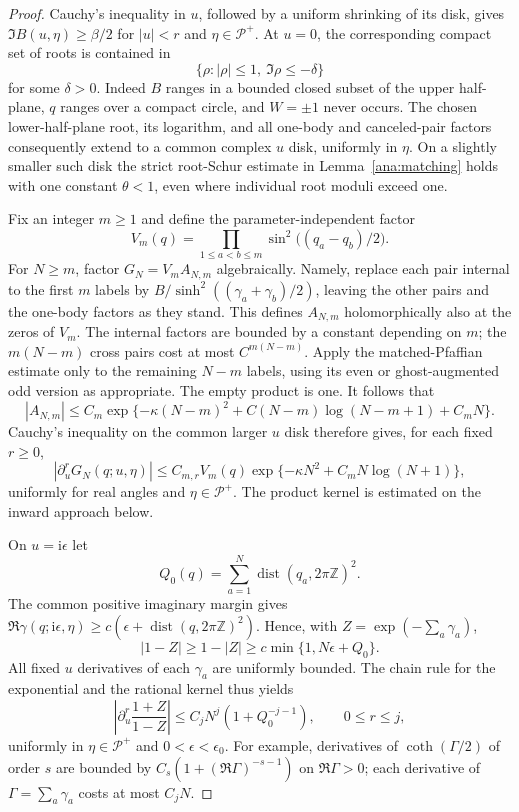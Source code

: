 \documentclass[11pt]{article}
\numberwithin{equation}{section}
\theoremstyle{definition}
\begin{document}
\begin{proof}
Cauchy's inequality in $u$, followed by a uniform shrinking of its
disk, gives $\Im B(u,\eta)\ge\beta/2$ for $|u|<r$ and
$\eta\in\mathcal P^+$.  At $u=0$, the corresponding compact
set of roots is contained in
\[
 \{\rho:|\rho|\le1,\ \Im\rho\le-\delta\}
\]
for some $\delta>0$.  Indeed $B$ ranges in a bounded closed subset
of the upper half-plane, $q$ ranges over a compact circle, and
$W=\pm1$ never occurs.  The chosen lower-half-plane root, its
logarithm, and all one-body and canceled-pair factors consequently
extend to a common complex $u$ disk, uniformly in $\eta$.
On a slightly smaller such disk the strict root-Schur estimate in
Lemma~\ref{ana:matching} holds with one constant $\theta<1$, even
where individual root moduli exceed one.

Fix an integer $m\ge1$ and define the parameter-independent factor
\[
 V_m(q)=\prod_{1\le a<b\le m}
                  \sin^2\bigl((q_a-q_b)/2\bigr).
\]
For $N\ge m$, factor $G_N=V_m A_{N,m}$ algebraically.  Namely,
replace each pair internal to the first $m$ labels by
$B/\sinh^2((\gamma_a+\gamma_b)/2)$, leaving the other pairs and
the one-body factors as they stand. This defines $A_{N,m}$
holomorphically also at the zeros of $V_m$.
The internal factors are bounded by a constant depending on $m$;
the $m(N-m)$ cross pairs cost at most $C^{m(N-m)}$.
Apply the matched-Pfaffian estimate only to the remaining $N-m$
labels, using its even or ghost-augmented odd version as appropriate.
The empty product is one.  It follows that
\[
 |A_{N,m}|
 \le C_m\exp\{-\kappa(N-m)^2
       +C(N-m)\log(N-m+1)+C_mN\}.
\]
Cauchy's inequality on the common larger $u$ disk therefore gives,
for each fixed $r\ge0$,
\begin{equation}\label{ana:block-numerator}
 |\partial_u^rG_N(q;u,\eta)|
 \le C_{m,r}V_m(q)
       \exp\{-\kappa N^2+C_mN\log(N+1)\},
\end{equation}
uniformly for real angles and $\eta\in\mathcal P^+$.
The product kernel is estimated on the inward approach below.

On $u=\mathrm i\epsilon$ let
\[
 Q_0(q)=\sum_{a=1}^N\operatorname{dist}(q_a,2\pi\mathbb Z)^2.
\]
The common positive imaginary margin gives
$\Re\gamma(q;\mathrm i\epsilon,\eta)
\ge c(\epsilon+\operatorname{dist}(q,2\pi\mathbb Z)^2)$.
Hence, with $Z=\exp(-\sum_a\gamma_a)$,
\[
 |1-Z|\ge1-|Z|\ge c\min\{1,N\epsilon+Q_0\}.
\]
All fixed $u$ derivatives of each $\gamma_a$ are uniformly bounded.
The chain rule for the exponential and the rational kernel thus yields
\begin{equation}\label{ana:block-kernel}
 \left|\partial_u^r\frac{1+Z}{1-Z}\right|
 \le C_jN^j(1+Q_0^{-j-1}),\qquad 0\le r\le j,
\end{equation}
uniformly in $\eta\in\mathcal P^+$ and $0<\epsilon<\epsilon_0$.
For example, derivatives of $\coth(\Gamma/2)$ of order $s$ are
bounded by $C_s(1+(\Re\Gamma)^{-s-1})$ on $\Re\Gamma>0$;
each derivative of $\Gamma=\sum_a\gamma_a$ costs at most $C_jN$.


\end{proof}
\end{document}
